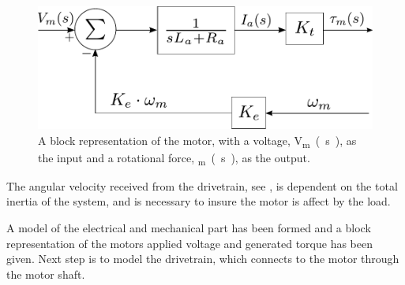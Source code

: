 \begin{figure}[H]
	\centering
	\includegraphics[scale=0.9]{figures/motormodelBlock.pdf}
	\caption{A block representation of the motor, with a voltage, \si{V_m(s)}, as the input and a rotational force, \si{\tau_m(s)}, as the output.}
	\label{fig:motormodelBlock}
\end{figure}

The angular velocity received from the drivetrain, see , is dependent on the total inertia of the system, and is necessary to insure the motor is affect by the load.

A model of the electrical and mechanical part has been formed and a block representation of the motors applied voltage and generated torque has been given. Next step is to model the drivetrain, which connects to the motor through the motor shaft.